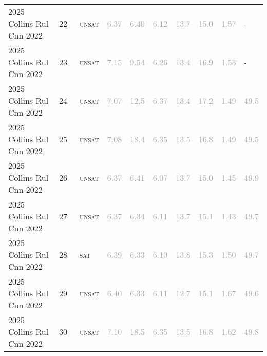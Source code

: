 \begin{center}
{\begin{longtable}{@{}llllllllll@{}}
2025 Collins Rul Cnn 2022 & 22 & ~\textsc{unsat} & \textcolor{darkgray}{6.37} & \textcolor{darkgray}{6.40} & \textcolor{darkgray}{6.12} & \textcolor{darkgray}{13.7} & \textcolor{darkgray}{15.0} & \textcolor{darkgray}{1.57} & - \\
2025 Collins Rul Cnn 2022 & 23 & ~\textsc{unsat} & \textcolor{darkgray}{7.15} & \textcolor{darkgray}{9.54} & \textcolor{darkgray}{6.26} & \textcolor{darkgray}{13.4} & \textcolor{darkgray}{16.9} & \textcolor{darkgray}{1.53} & - \\
2025 Collins Rul Cnn 2022 & 24 & ~\textsc{unsat} & \textcolor{darkgray}{7.07} & \textcolor{darkgray}{12.5} & \textcolor{darkgray}{6.37} & \textcolor{darkgray}{13.4} & \textcolor{darkgray}{17.2} & \textcolor{darkgray}{1.49} & \textcolor{darkgray}{49.5} \\
2025 Collins Rul Cnn 2022 & 25 & ~\textsc{unsat} & \textcolor{darkgray}{7.08} & \textcolor{darkgray}{18.4} & \textcolor{darkgray}{6.35} & \textcolor{darkgray}{13.5} & \textcolor{darkgray}{16.8} & \textcolor{darkgray}{1.49} & \textcolor{darkgray}{49.5} \\
2025 Collins Rul Cnn 2022 & 26 & ~\textsc{unsat} & \textcolor{darkgray}{6.37} & \textcolor{darkgray}{6.41} & \textcolor{darkgray}{6.07} & \textcolor{darkgray}{13.7} & \textcolor{darkgray}{15.0} & \textcolor{darkgray}{1.45} & \textcolor{darkgray}{49.9} \\
2025 Collins Rul Cnn 2022 & 27 & ~\textsc{unsat} & \textcolor{darkgray}{6.37} & \textcolor{darkgray}{6.34} & \textcolor{darkgray}{6.11} & \textcolor{darkgray}{13.7} & \textcolor{darkgray}{15.1} & \textcolor{darkgray}{1.43} & \textcolor{darkgray}{49.7} \\
2025 Collins Rul Cnn 2022 & 28 & ~\textsc{sat} & \textcolor{darkgray}{6.39} & \textcolor{darkgray}{6.33} & \textcolor{darkgray}{6.10} & \textcolor{darkgray}{13.8} & \textcolor{darkgray}{15.3} & \textcolor{darkgray}{1.50} & \textcolor{darkgray}{49.7} \\
2025 Collins Rul Cnn 2022 & 29 & ~\textsc{unsat} & \textcolor{darkgray}{6.40} & \textcolor{darkgray}{6.33} & \textcolor{darkgray}{6.11} & \textcolor{darkgray}{12.7} & \textcolor{darkgray}{15.1} & \textcolor{darkgray}{1.67} & \textcolor{darkgray}{49.6} \\
2025 Collins Rul Cnn 2022 & 30 & ~\textsc{unsat} & \textcolor{darkgray}{7.10} & \textcolor{darkgray}{18.5} & \textcolor{darkgray}{6.35} & \textcolor{darkgray}{13.5} & \textcolor{darkgray}{16.8} & \textcolor{darkgray}{1.62} & \textcolor{darkgray}{49.8} \\

\end{longtable}}
\end{center}
